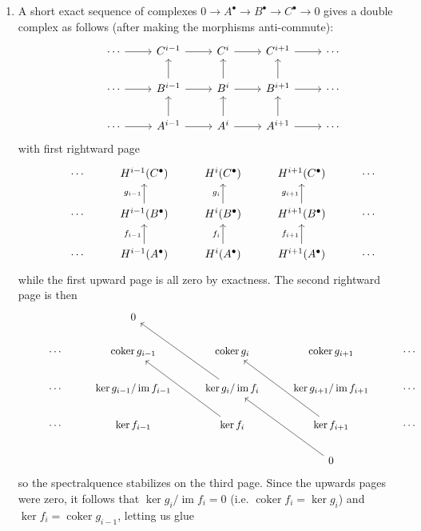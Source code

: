 \documentclass{report}
\DeclareMathOperator{\im}{im}
\DeclareMathOperator{\coker}{coker}
\begin{document}
\begin{enumerate}[label=\textbf{1.7.\Alph*.}]
	\item A short exact sequence of complexes
	      $0\to A^\bullet\to B^\bullet\to C^\bullet\to0$ gives a double complex as
	      follows (after making the morphisms anti-commute):
	      \begin{equation*}
		      \begin{tikzcd}
			      &\cdots \ar[r] &C^{i-1} \ar[r] &C^i \ar[r] &C^{i+1} \ar[r] &\cdots \\
			      &\cdots \ar[r] &B^{i-1} \ar[u] \ar[r] &B^i \ar[u] \ar[r] &B^{i+1} \ar[u] \ar[r] &\cdots \\
			      &\cdots \ar[r] &A^{i-1} \ar[u] \ar[r] &A^i \ar[u] \ar[r] &A^{i+1} \ar[u] \ar[r] &\cdots
		      \end{tikzcd}
	      \end{equation*}
	      with first rightward page
	      \begin{equation*}
		      \begin{tikzcd}
			      &\cdots &H^{i-1}(C^\bullet) &H^i(C^\bullet) &H^{i+1}(C^\bullet) &\cdots \\
			      &\cdots &H^{i-1}(B^\bullet) \ar[u,"g_{i-1}"] &H^i(B^\bullet) \ar[u,"g_i"] &H^{i+1}(B^\bullet) \ar[u,"g_{i+1}"] &\cdots \\
			      &\cdots &H^{i-1}(A^\bullet) \ar[u,"f_{i-1}"] &H^i(A^\bullet) \ar[u,"f_i"] &H^{i+1}(A^\bullet) \ar[u,"f_{i+1}"] &\cdots
		      \end{tikzcd}
	      \end{equation*}
	      while the first upward page is all zero by exactness. The second
	      rightward page is then
	      \begin{equation*}
		      \begin{tikzcd}
			      & &0 & & & \\
			      &\cdots &\coker g_{i-1} &\coker g_i &\coker g_{i+1} &\cdots \\
			      &\cdots &\ker g_{i-1}/\im f_{i-1} &\ker g_i/\im f_i \ar[uul] &\ker g_{i+1}/\im f_{i+1} &\cdots \\
			      &\cdots &\ker f_{i-1} &\ker f_i \ar[uul] &\ker f_{i+1} \ar[uul] &\cdots \\
			      & & & &0 \ar[uul] &
		      \end{tikzcd}
	      \end{equation*}
	      so the spectralquence stabilizes on the third page. Since the upwards
	      pages were zero, it follows that $\ker g_i/\im f_i=0$ (i.e.
	      $\coker f_i=\ker g_i$) and $\ker f_i=\coker g_{i-1}$, letting us glue
	      \begin{equation*}

\end{equation*}
\end{enumerate}
\end{document}
